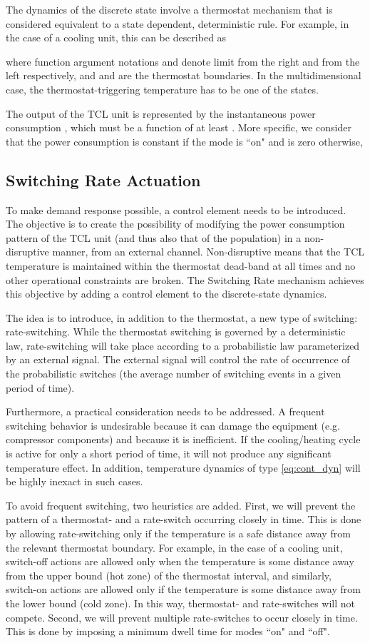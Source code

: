 \documentclass[submission,copyright,creativecommons]{eptcs}
\begin{document}
The dynamics of the discrete state involve a thermostat mechanism that is considered equivalent to a state dependent, deterministic rule. For example, in the case of a cooling unit, this can be described as

where function argument notations  and  denote limit from the right and from the left respectively, and  and  are the thermostat boundaries. In the multidimensional case, the thermostat-triggering temperature has to be one of the states.


The output of the TCL unit is represented by the instantaneous power consumption , which must be a function of at least . More specific, we consider that the power consumption is constant  if the mode is ``on" and is zero otherwise, 


\subsection{Switching Rate Actuation}
To make demand response possible, a control element needs to be introduced. The objective is to create the possibility of modifying the power consumption pattern of the TCL unit (and thus also that of the population) in a non-disruptive manner, from an external channel. Non-disruptive means that the TCL temperature is maintained within the thermostat dead-band at all times and no other operational constraints are broken. The Switching Rate mechanism achieves this objective by adding a control element to the discrete-state dynamics.

The idea is to introduce, in addition to the thermostat, a new type of switching: rate-switching. While the thermostat switching is governed by a deterministic law, rate-switching will take place according to a probabilistic law parameterized by an external signal. The external signal will control the rate of occurrence of the probabilistic switches (the average number of switching events in a given period of time). 


Furthermore, a practical consideration needs to be addressed. A frequent switching behavior is undesirable because it can damage the equipment (e.g. compressor components) and because it is inefficient. If the cooling/heating cycle is active for only a short period of time, it will not produce any significant temperature effect. In addition, temperature dynamics of type \eqref{eq:cont_dyn} will be highly inexact in such cases. 

To avoid frequent switching, two heuristics are added. First, we will prevent the pattern of a thermostat- and a rate-switch occurring closely in time. This is done by allowing rate-switching only if the temperature is a safe distance away from the relevant thermostat boundary. For example, in the case of a cooling unit, switch-off actions are allowed only when the temperature is some distance away from the upper bound (hot zone) of the thermostat interval, and similarly, switch-on actions are allowed only if the temperature is some distance away from the lower bound (cold zone). In this way,  thermostat- and rate-switches will not compete. Second, we will prevent multiple rate-switches to occur closely in time. This is done by imposing a minimum dwell time for modes ``on" and ``off".
\end{document}
